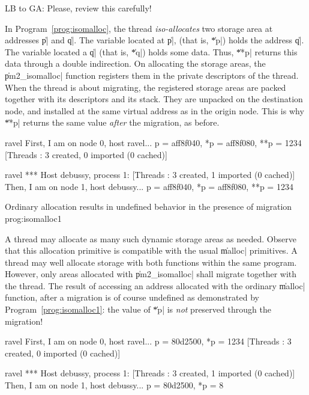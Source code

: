\begin{note}
  LB to GA: Please, review this carefully!
\end{note}

In Program~\ref{prog:isomalloc}, the thread \emph{iso-allocates}
two storage area at addresses \|p| and \|q|. The variable located at
\|p|, (that is, \|*p|) holds the address \|q|. The variable located a
\|q| (that is, \|*q|) holds some data. Thus, \|**p| returns this
data through a double indirection. On allocating the storage areas, the
\|pm2_isomalloc| function registers them in the private descriptors of
the thread. When the thread is about migrating, the registered storage
areas are packed together with its descriptors and its stack. They are
unpacked on the destination node, and installed at the same virtual
address as in the origin node. This is why \|**p| returns the same
value \emph{after} the migration, as before. 
\begin{shell}
ravel%
First, I am on node 0, host ravel...
p = aff8f040, *p = aff8f080, **p = 1234
[Threads : 3 created, 0 imported (0 cached)]

ravel%
*** Host debussy, process 1:
[Threads : 3 created, 1 imported (0 cached)]
Then, I am on node 1, host debussy...
p = aff8f040, *p = aff8f080, **p = 1234
\end{shell}

 {Ordinary allocation results in
  undefined behavior in the presence of
  migration} {prog:isomalloc1}

A thread may allocate as many such dynamic storage areas as
needed. Observe that this allocation primitive is compatible with the
usual \|malloc| primitives. A thread may well allocate storage with
both functions within the same program. However, only areas allocated
with \|pm2_isomalloc| shall migrate together with the thread. The
result of accessing an address allocated with the ordinary \|malloc|
function, after a migration is of course undefined as demonstrated by
Program~\ref{prog:isomalloc1}: the value of \|*p| is \emph{not}
preserved through the migration!
\begin{shell}
ravel%
First, I am on node 0, host ravel...
p = 80d2500, *p = 1234
[Threads : 3 created, 0 imported (0 cached)]

ravel%
*** Host debussy, process 1:
[Threads : 3 created, 1 imported (0 cached)]
Then, I am on node 1, host debussy...
p = 80d2500, *p = 8
\end{shell}

